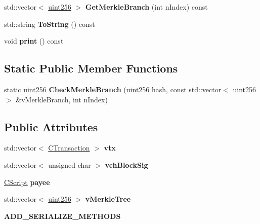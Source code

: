 \begin{DoxyCompactItemize}
\item 
\mbox{\label{class_c_block_a336b7154a9ab29c326941fa2491b2daa}} 
std\+::vector$<$ \mbox{\hyperlink{classuint256}{uint256}} $>$ {\bfseries Get\+Merkle\+Branch} (int n\+Index) const
\item 
\mbox{\label{class_c_block_a0e8a98f10831c00ae76b3a831c4804e5}} 
std\+::string {\bfseries To\+String} () const
\item 
\mbox{\label{class_c_block_a0507a658d82d5e4ec55d550460e06ff9}} 
void {\bfseries print} () const
\end{DoxyCompactItemize}
\subsection*{Static Public Member Functions}
\begin{DoxyCompactItemize}
\item 
\mbox{\label{class_c_block_a81684cf96f6fb6731c869865b80d1ccd}} 
static \mbox{\hyperlink{classuint256}{uint256}} {\bfseries Check\+Merkle\+Branch} (\mbox{\hyperlink{classuint256}{uint256}} hash, const std\+::vector$<$ \mbox{\hyperlink{classuint256}{uint256}} $>$ \&v\+Merkle\+Branch, int n\+Index)
\end{DoxyCompactItemize}
\subsection*{Public Attributes}
\begin{DoxyCompactItemize}
\item 
\mbox{\label{class_c_block_a9b6508d662722775f3029b980b382b66}} 
std\+::vector$<$ \mbox{\hyperlink{class_c_transaction}{C\+Transaction}} $>$ {\bfseries vtx}
\item 
\mbox{\label{class_c_block_a78f882e24c4416f42039cbc6a67faf6e}} 
std\+::vector$<$ unsigned char $>$ {\bfseries vch\+Block\+Sig}
\item 
\mbox{\label{class_c_block_a1604a6d25f313ab1bf4e3777a6cba948}} 
\mbox{\hyperlink{class_c_script}{C\+Script}} {\bfseries payee}
\item 
\mbox{\label{class_c_block_a019ae6579acd08974653d3f443dd398a}} 
std\+::vector$<$ \mbox{\hyperlink{classuint256}{uint256}} $>$ {\bfseries v\+Merkle\+Tree}
\item 
\mbox{\label{class_c_block_a53ba28b86cf6c5b1de640941786fa3b8}} 
{\bfseries A\+D\+D\+\_\+\+S\+E\+R\+I\+A\+L\+I\+Z\+E\+\_\+\+M\+E\+T\+H\+O\+DS}
\end{DoxyCompactItemize}
